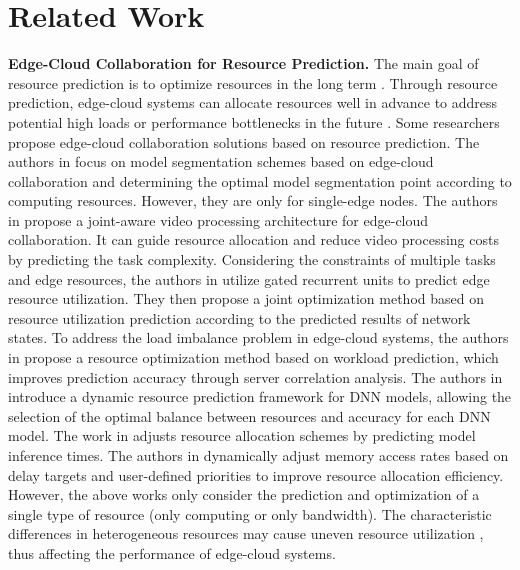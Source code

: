 \section{Related Work}
\textbf{Edge-Cloud Collaboration for Resource Prediction.} 
The main goal of resource prediction is to optimize resources in the long term \cite{sun2016optimizing353535}. Through resource prediction, edge-cloud systems can allocate resources well in advance to address potential high loads or performance bottlenecks in the future \cite{miao2020intelligent363636}. Some researchers propose edge-cloud collaboration solutions based on resource prediction. The authors in \cite{kang2017neurosurgeon222222,dong2022splitnets232323} focus on model segmentation schemes based on edge-cloud collaboration and determining the optimal model segmentation point according to computing resources. However, they are only for single-edge nodes. The authors in \cite{yang2023javp666} propose a joint-aware video processing architecture for edge-cloud collaboration. It can guide resource allocation and reduce video processing costs by predicting the task complexity. Considering the constraints of multiple tasks and edge resources, the authors in \cite{sun2021cloud121212} utilize gated recurrent units to predict edge resource utilization. They then propose a joint optimization method based on resource utilization prediction according to the predicted results of network states. To address the load imbalance problem in edge-cloud systems, the authors in \cite{li2023elastic131313} propose a resource optimization method based on workload prediction, which improves prediction accuracy through server correlation analysis. The authors in \cite{fang2018nestdnn141414} introduce a dynamic resource prediction framework for DNN models, allowing the selection of the optimal balance between resources and accuracy for each DNN model. The work in \cite{gujarati2020serving242424} adjusts resource allocation schemes by predicting model inference times. The authors in \cite{kim2023moca252525} dynamically adjust memory access rates based on delay targets and user-defined priorities to improve resource allocation efficiency. However, the above works only consider the prediction and optimization of a single type of resource (only computing or only bandwidth). The characteristic differences in heterogeneous resources may cause uneven resource utilization \cite{feng2022heterogeneous373737}, thus affecting the performance of edge-cloud systems.

